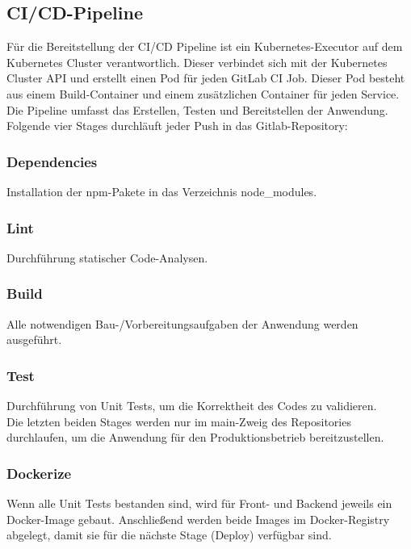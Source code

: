 \documentclass[letterpaper, 10 pt, conference]{ieeeconf}
\begin{document}
\subsection{CI/CD-Pipeline}

Für die Bereitstellung der CI/CD Pipeline ist ein Kubernetes-Executor\cite{c1} auf dem Kubernetes Cluster verantwortlich.  Dieser verbindet sich mit der Kubernetes Cluster API und erstellt einen Pod für jeden GitLab CI Job. Dieser Pod besteht aus einem Build-Container und einem zusätzlichen Container für jeden Service. Die Pipeline umfasst das Erstellen, Testen und Bereitstellen der Anwendung.  Folgende vier Stages durchläuft jeder Push in das Gitlab-Repository:

\subsubsection{Dependencies}

Installation der npm-Pakete in das Verzeichnis node\_modules.

\subsubsection{Lint}

Durchführung statischer Code-Analysen.

\subsubsection{Build}

Alle notwendigen Bau-/Vorbereitungsaufgaben der Anwendung werden ausgeführt.

\subsubsection{Test}

Durchführung von Unit Tests, um die Korrektheit des Codes zu validieren.  \\

Die letzten beiden Stages werden nur im main-Zweig des Repositories durchlaufen, um die Anwendung für den Produktionsbetrieb bereitzustellen.

\subsubsection{Dockerize}

Wenn alle Unit Tests bestanden sind, wird für Front- und Backend jeweils ein Docker-Image gebaut. Anschließend werden beide Images im Docker-Registry abgelegt, damit sie für die nächste Stage (Deploy) verfügbar sind.  
\end{document}
